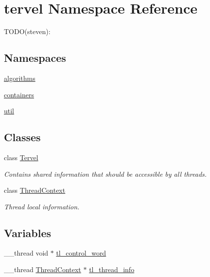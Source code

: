 \hypertarget{namespacetervel}{}\section{tervel Namespace Reference}
\label{namespacetervel}


T\+O\+D\+O(steven)\+:  


\subsection*{Namespaces}
\begin{DoxyCompactItemize}
\item 
 \hyperlink{namespacetervel_1_1algorithms}{algorithms}
\item 
 \hyperlink{namespacetervel_1_1containers}{containers}
\item 
 \hyperlink{namespacetervel_1_1util}{util}
\end{DoxyCompactItemize}
\subsection*{Classes}
\begin{DoxyCompactItemize}
\item 
class \hyperlink{classtervel_1_1_tervel}{Tervel}
\begin{DoxyCompactList}\small\item\em Contains shared information that should be accessible by all threads. \end{DoxyCompactList}\item 
class \hyperlink{classtervel_1_1_thread_context}{Thread\+Context}
\begin{DoxyCompactList}\small\item\em Thread local information. \end{DoxyCompactList}\end{DoxyCompactItemize}
\subsection*{Variables}
\begin{DoxyCompactItemize}
\item 
\+\_\+\+\_\+thread void $\ast$ \hyperlink{namespacetervel_a1270a409d1f2adfb02a9665f95203f2b}{tl\+\_\+control\+\_\+word}
\item 
\+\_\+\+\_\+thread \hyperlink{classtervel_1_1_thread_context}{Thread\+Context} $\ast$ \hyperlink{namespacetervel_a60b23602adbb2dee6160af411b74bfd3}{tl\+\_\+thread\+\_\+info}
\end{DoxyCompactItemize}


